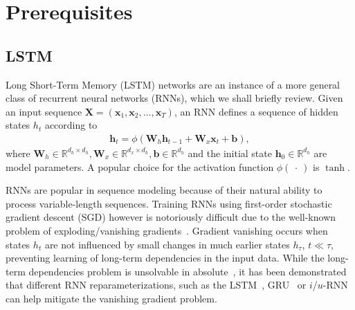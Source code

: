 \documentclass{article} %
\newcommand{\vect}[1]{\mathbf{#1}}
\newcommand{\mat}[1]{\mathbf{#1}}
\newcommand{\reals}{\mathbb{R}}
\begin{document}
\section{Prerequisites}
\label{sec:prerequisites}


\subsection{LSTM}

Long Short-Term Memory (LSTM) networks are an instance of a more general class of recurrent neural networks (RNNs),
which we shall briefly review.
Given an input sequence $\mat{X} = ( \vect{x}_1, \vect{x}_2, \ldots, \vect{x}_T )$,
an RNN defines a sequence of hidden states $h_t$ according to
\begin{eqnarray}
  \mat{h}_t = \phi(\mat{W}_h \vect{h}_{t-1} + \mat{W}_x  \vect{x}_t + \vect{b}),
\end{eqnarray}
where $\mat{W}_h \in \reals^{d_h \times d_h}, \mat{W}_x \in \reals^{d_x \times d_h}, \vect{b} \in \reals^{d_h}$
and the initial state $\vect{h}_0 \in \reals^{d_h}$ %
are model parameters.
A popular choice for the activation function $\phi(\ \cdot\ )$ is $\tanh$.

RNNs are popular in sequence modeling because of their natural ability to process variable-length sequences.
Training RNNs using first-order stochastic gradient descent (SGD) however is notoriously difficult
due to the well-known problem of exploding/vanishing gradients~\cite{bengio1994learning,hochreiter1991untersuchungen,pascanudifficulty}.
Gradient vanishing occurs when states $h_t$ are not influenced by small changes in much earlier states $h_{\tau}$, $t \ll \tau$,
preventing learning of long-term dependencies in the input data.
While the long-term dependencies problem is unsolvable in absolute~\cite{bengio1994learning},
it has been demonstrated that different RNN reparameterizations, such as the LSTM~\cite{lstm}, GRU~\cite{cho2014learning} or $i$/$u$-RNN~\cite{le2015simple,urnn}
can help mitigate the vanishing gradient problem.
\end{document}

